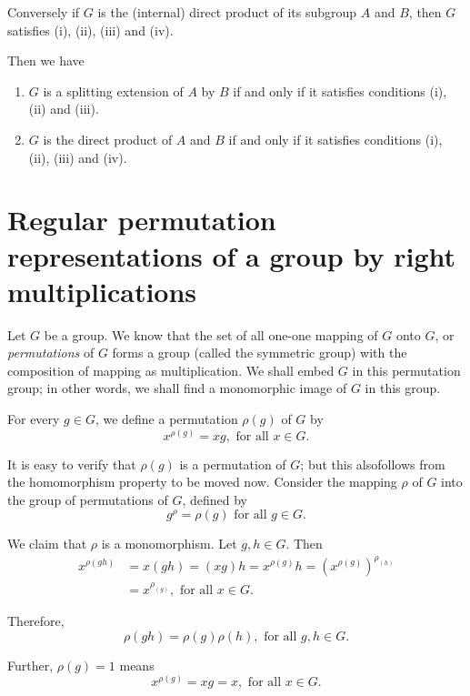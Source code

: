 Conversely if $G$ is the (internal) direct product of its subgroup $A$
and $B$, then $G$ satisfies  (i), (ii), (iii) and (iv). 

Then we have 
\begin{theorem}\label{chap6:sec4:thm4} %
  \begin{enumerate}
    \renewcommand{\labelenumi}{\rm \theenumi.}
  \item $G$ is a splitting extension  of $A$ by $B$ if and only if it
    satisfies conditions (i), (ii) and (iii). 
  \item $G$ is the direct product of $A$ and $B$ if and only if it
    satisfies conditions (i), (ii), (iii) and (iv). 
  \end{enumerate}
\end{theorem} 
 
\section[Regular permutation representations...]{Regular permutation representations of a group by right
  multiplications}\label{chap6:sec5} %
 
Let $G$ be a group. We know that the set of  all one-one mapping of
$G$ onto $G$, or \textit{permutations} of $G$ forms a group (called
the symmetric group) with the composition of mapping as
multiplication. We shall embed $G$ in this permutation  group; in
other words, we shall find a monomorphic image  of $G$ in this group. 
 
For every $g \in  G$, we define a permutation $\rho (g)$ of $G$ by 
$$
x^{\rho (g)}= xg,  \text{ for all } x \in  G.
$$
 
It is easy to verify that $\rho (g)$ is a permutation of $G$; but this
also\pageoriginale follows from the homomorphism property to be moved now. Consider the
mapping $\rho$ of $G$ into the group of permutations of $G$, defined
by  
$$
g^\rho = \rho(g) \text{ for all } g \in  G.
$$
 
 We claim that $\rho$ is a monomorphism. Let $g,h \in  G$. Then 
 \begin{align*}
   x^{\rho (gh)} & = x(gh) = (xg) h =x^{\rho(g)}h= (x^{\rho (g)})^{\rho_{(h)}} \\
   &= x^{\rho_{(g)}}, \text{ for all } x \in  G.
 \end{align*} 
 
 Therefore,
 $$
 \rho (gh) =\rho (g) \rho(h), \text{ for all } g,h \in  G.
 $$
 
 Further, $\rho(g)=1$ means
 $$
 x^{\rho(g)}=xg=x, \text{  for all  } x \in G.
 $$
 
